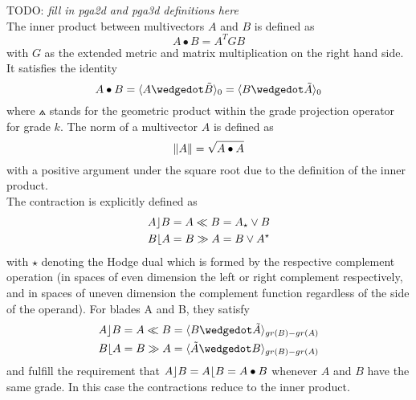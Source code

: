 TODO: \emph{fill in pga2d and pga3d definitions here} \\


The inner product between multivectors $A$ and $B$ is defined as
\begin{equation}
    A \bullet B = A^{T} G B
    \label{eg:inner_product_metric}
\end{equation}
with $G$ as the extended metric and matrix multiplication on the right hand side. It
satisfies the identity
\begin{equation}
    A \bullet B  = \grprj{A \wedgedot \tilde{B}}{0} = \grprj{ B \wedgedot \tilde{A} }{0}
    \label{eq:inner_product_link_to_gpr}
\end{equation}
where $\wedgedot$ stands for the geometric product within the grade projection operator
 for grade $k$. The norm of a multivector $A$ is defined as
\begin{equation}
    \left \lVert {A} \right \rVert = \sqrt{A \bullet A}
    \label{eq:norm_mv}
\end{equation}
with a positive argument under the square root due to the definition of the inner product.
\\

The contraction is explicitly defined as
\begin{subequations}
    \begin{align}
    A \rfloor B & = A \ll B = A_{\star} \vee B
    \label{eq:lcontr} \\
    B \lfloor A & = B \gg A = B \vee A^{\star}
    \label{eq:rcontr}
    \end{align}
\end{subequations}
with $\star$ denoting the Hodge dual which is formed by the respective complement
operation (in spaces of even dimension the left or right complement respectively, and in
spaces of uneven dimension the complement function regardless of the side of the operand).
For blades A and B, they satisfy
\begin{subequations}
    \begin{align}
    A \lcontr B &  = A \ll B = \grprj{B \wedgedot \tilde{A}}{gr(B)-gr(A)}
    \label{eq:lcontr_gpr} \\
    B \rcontr A & = B \gg A = \grprj{\tilde{A} \wedgedot B}{gr(B)-gr(A)}
    \label{eq:rcontr_gpr}
    \end{align}
\end{subequations}
and fulfill the requirement that $A \rfloor B = A \lfloor B = A \bullet B$ whenever $A$
and $B$ have the same grade. In this case the contractions reduce to the inner product. \\


